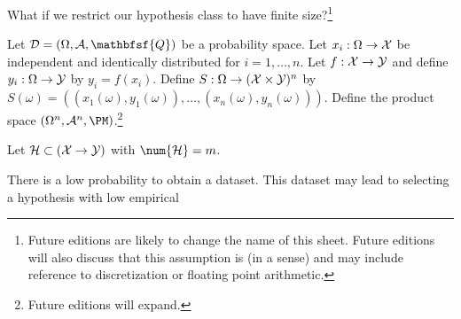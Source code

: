 

What if we restrict our hypothesis class to have finite size?\footnote{Future editions are likely to change the name of this sheet. Future editions will also discuss that this assumption is (in a sense)  and may include reference to discretization or floating point arithmetic.}


Let $\CD = (\Omega, \CA, \mathbfsf{Q})$ be a probability space.
Let $x_i: \Omega \to \mathcal{X}$ be independent and identically distributed for $i = 1, \dots, n$.
Let $f: \mathcal{X} \to \mathcal{Y}$ and define $y_i: \Omega \to \mathcal{Y}$ by $y_i = f(x_i)$.
Define $S: \Omega \to (\mathcal{X} \times \mathcal{Y})^n$ by $S(\omega) = ((x_1(\omega), y_1(\omega)), \dots, (x_n(\omega), y_n(\omega)))$.
Define the product space $(\Omega^n, \CA^n, \PM)$.\footnote{Future editions will expand.}

Let $\mathcal{H} \subset (\mathcal{X} \to \mathcal{Y})$ with $\num{\CH} = m$.

There is a low probability to obtain a  dataset.
This dataset may lead to selecting a hypothesis with low empirical

